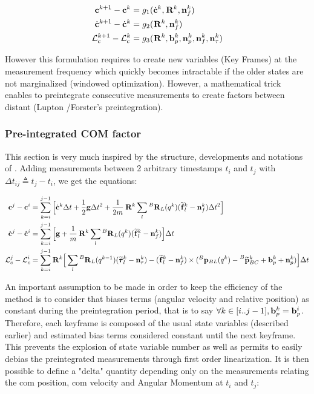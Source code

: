 \documentclass[11pt]{article}
\newcommand{\Rot}[2]{\prescript{#1}{}{\bfR}_{#2}}
\newcommand{\noise}{\bfn}
\newcommand{\bias}{\bfb}
\newcommand{\posi}[2]{\prescript{#1}{}{\bfp}_{#2}}
\newcommand{\posim}[2]{\prescript{#1}{}{\widetilde{\bfp}}_{#2}}
\newcommand{\forcem}[2]{\prescript{#1}{}{\widetilde{\bff}}_{#2}}
\newcommand{\torquem}[2]{\prescript{#1}{}{\widetilde{\pmb{\tau}}}_{#2}}
\newcommand{\AM}{\mathcal{L}}
\newcommand{\COM}{\bfc}
\newcommand{\COMd}{\dot{\bfc}}
\begin{document}
\begin{equation}
\begin{split}
\COM^{k+1} - \COM^{k} &=  g_1(\COMd^{k}, \Rot{}{}^{k}, \noise_f^{k})
\\
\COMd^{k+1} - \COMd^{k} &= g_2(\Rot{}{}^{k}, \noise_f^{k}) 
\\
\AM_c^{k+1} - \AM_c^{k} &= g_3(\Rot{}{}^{k}, \bias_{p}^k, \noise_p^k, \noise_f^{k}, \noise_\tau^{k})
\end{split}
\end{equation}

However this formulation requires to create new variables (Key Frames) at the measurement frequency which quickly becomes intractable if the older states are not marginalized (windowed optimization). However, a mathematical trick enables to preintegrate consecutive measurements to create factors between distant (Lupton \cite{lupton2011visual}/Forster's \cite{forster2016manifold} preintegration).  

\subsubsection{Pre-integrated COM factor}
This section is very much inspired by the structure, developments and notations of \cite{forster2016manifold}.
Adding measurements between 2 arbitrary timestamps \(t_i\) and \(t_j\) with \(\Delta t_{ij} \triangleq t_j - t_i\), we get the equations:

\begin{equation}
\begin{split}
\COM^{j} - \COM^{i} &= \sum_{k=i}^{j-1} \Big[ 
\COMd^{k} \Delta t 
+ \dfrac{1}{2}\bfg \Delta t^2 + \frac{1}{2m} \Rot{}{}^{k} \sum_l \Rot{B}{L}(q^{k}) (\forcem{}{l}^{k} - \noise_f^{k})\Delta t^2 \Big]
\\
\COMd^{j} - \COMd^{i} &= \sum_{k=i}^{j-1} \Big[ 
\bfg + \frac{1}{m} \Rot{}{}^{k} \sum_l \Rot{B}{L}(q^{k}) (\forcem{}{l}^{k} - \noise_f^{k}) \Big] \Delta t 
\\
\AM_c^{j} - \AM_c^{i} &=  \sum_{k=i}^{j-1} \Rot{}{}^{k} \Big[ 
\sum_l \Rot{B}{L}(q^{k-1}) (\torquem{}{l}^{k} - \noise_{\tau}^{k}) - (\forcem{}{l}^{k} - \noise_f^{k}) \times (\posi{B}{BL}(q^k) - \posim{B}{BC}^k + \bias_{p}^k + \noise_p^k) \Big]  \Delta t
\end{split}
\label{eq:COMij}
\end{equation}

An important assumption to be made in order to keep the efficiency of the method is to consider that biases terms (angular velocity and relative position) as constant during the preintegration period, that is to say $\forall k \in [i..j-1], \bias_p^k = \bias_p^i $. Therefore, each keyframe is composed of the usual state variables (described earlier) and estimated bias terms considered constant until the next keyframe. This prevents the explosion of state variable number as well as permits to easily debias the preintegrated measurements through first order linearization.
It is then possible to define a "delta" quantity depending only on the measurements relating the com position, com velocity and Angular Momentum at \(t_i\) and \(t_j\):
\end{document}
